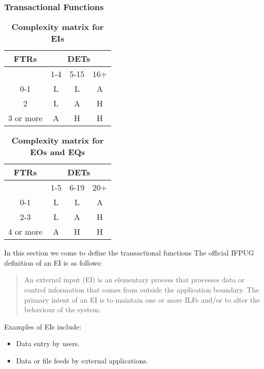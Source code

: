 \subsubsection{Transactional Functions}

\begin{longtable}{| c | c | c | c |}
	\caption{\textbf{Complexity matrix for EIs}}
	\label{tab:ei_complexity_matrix}
	\\ \hline
	
	\textbf{FTRs}  & \multicolumn{3}{c|}{\textbf{DETs}} \\ \hline
	   & 1-4  & 5-15  & 16+ \\ \hline
	0-1  & L  & L  & A \\ \hline
	2  & L  & A  & H \\ \hline
	3 or more  & A  & H  & H \\ \hline
\end{longtable}

\begin{longtable}{| c | c | c | c |}
	\caption{\textbf{Complexity matrix for EOs and EQs}}
	\label{tab:eo_eq_complexity_matrix}
	\\ \hline
	
	\textbf{FTRs}  & \multicolumn{3}{c|}{\textbf{DETs}} \\ \hline
   		 & 1-5  & 6-19  & 20+ \\ \hline 
	0-1  & L  & L  & A \\ \hline 
	2-3  & L  & A  & H \\ \hline 
	4 or more  & A  & H  & H \\ \hline 
\end{longtable}

In this section we come to define the transactional functions
The official IFPUG definition of an EI is as follows:

\begin{quote}
    An external input (EI) is an elementary process that processes data or control information that comes from outside the application boundary. The primary intent of an EI is to maintain one or more ILFs and/or to alter the behaviour of the system. 
\end{quote}
Examples of EIs include:
\begin{itemize}
    \item Data entry by users.
    \item Data or file feeds by external applications. 
\end{itemize}

